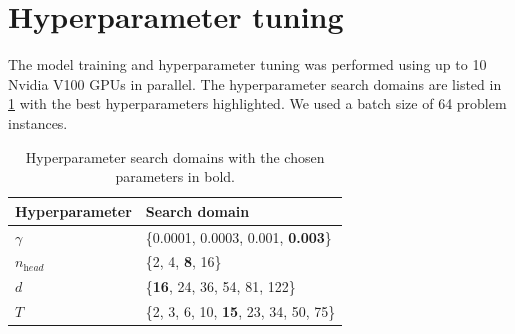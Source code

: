 \documentclass[english, 12pt, a4paper, sci, utf8, a-2b, online]{aaltothesis}
\newcommand{\draft}[1]{\textcolor{red}{\em (DRAFT) #1}}
\begin{document}
\clearpage
\thesisappendix

\section{Hyperparameter tuning}
\label{app:hyperparams}

The model training and hyperparameter tuning was performed using up to 10 Nvidia V100 GPUs in parallel. The hyperparameter search domains are listed in \cref{tab:hyper-results} with the best hyperparameters highlighted. We used a batch size of 64 problem instances.

\vspace{2cm}


\begin{table}[H]
    \centering
    \caption{Hyperparameter search domains with the chosen parameters in bold.}
    \label{tab:hyper-results}
    \begin{tabular}{l|l}
    Hyperparameter    & Search domain                                \\ \hline
    $\gamma$          & \{0.0001, 0.0003, 0.001, \textbf{0.003}\}    \\
    $n_\textit{head}$ & \{2, 4, \textbf{8}, 16\}                     \\
    $d$               & \{\textbf{16}, 24, 36, 54, 81, 122\}         \\
    $T$               & \{2, 3, 6, 10, \textbf{15}, 23, 34, 50, 75\}
    \end{tabular}
\end{table}




\end{document}
